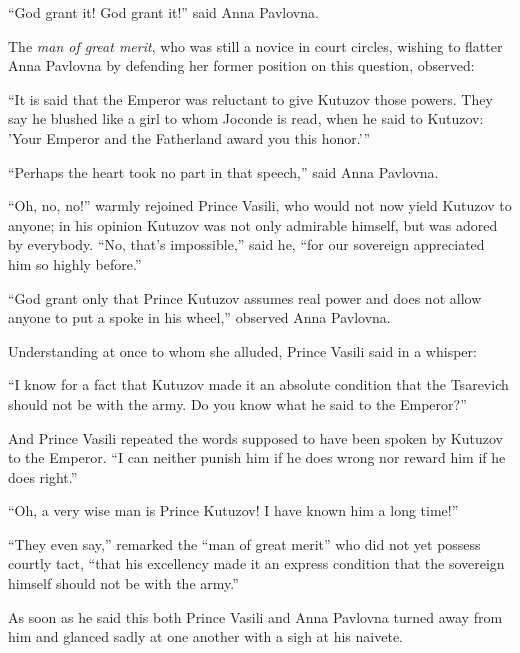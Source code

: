 ``God grant it! God grant it!'' said Anna Pavlovna.

The \emph{man of great merit}, who was still a novice in court
circles, wishing to flatter Anna Pavlovna by defending her former
position on this question, observed:

``It is said that the Emperor was reluctant to give Kutuzov those
powers.  They say he blushed like a girl to whom Joconde is read,
when he said to Kutuzov: 'Your Emperor and the Fatherland award
you this honor.'{}''

``Perhaps the heart took no part in that speech,'' said Anna
Pavlovna.

``Oh, no, no!'' warmly rejoined Prince Vasili, who would not now
yield Kutuzov to anyone; in his opinion Kutuzov was not only
admirable himself, but was adored by everybody. ``No, that's
impossible,'' said he, ``for our sovereign appreciated him so
highly before.''

``God grant only that Prince Kutuzov assumes real power and does
not allow anyone to put a spoke in his wheel,'' observed Anna
Pavlovna.

Understanding at once to whom she alluded, Prince Vasili said in
a whisper:

``I know for a fact that Kutuzov made it an absolute condition
that the Tsarevich should not be with the army. Do you know what
he said to the Emperor?''

And Prince Vasili repeated the words supposed to have been spoken
by Kutuzov to the Emperor. ``I can neither punish him if he does
wrong nor reward him if he does right.''

``Oh, a very wise man is Prince Kutuzov! I have known him a long
time!''

``They even say,'' remarked the ``man of great merit'' who did
not yet possess courtly tact, ``that his excellency made it an
express condition that the sovereign himself should not be with
the army.''

As soon as he said this both Prince Vasili and Anna Pavlovna
turned away from him and glanced sadly at one another with a sigh
at his naivete.


